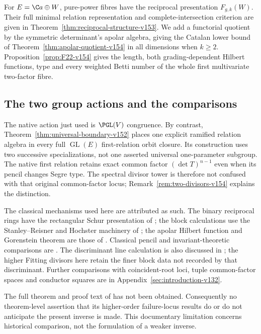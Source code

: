 For $E=\C a\oplus W$, pure-power fibres have the reciprocal
presentation $F_{g,k}(W)$. Their full minimal relation representation
and complete-intersection criterion are given in
Theorem~\ref{thm:reciprocal-structure-v153}. We add a functorial
quotient by the symmetric determinant's apolar algebra, giving the
Catalan lower bound of Theorem~\ref{thm:apolar-quotient-v154} in
all dimensions when $k\geq2$. Proposition~\ref{prop:F22-v154}
gives the length, both grading-dependent Hilbert functions, type
and every weighted Betti number of the whole first multivariate
two-factor fibre.

\subsection{The two group actions and the comparisons}
The native action just used is $\PGL(V)$ congruence. By contrast,
Theorem~\ref{thm:universal-boundary-v152} places one explicit
ramified relation algebra in every full $\operatorname{GL}(E)$
first-relation orbit closure. Its construction uses two successive
specializations, not one asserted universal one-parameter subgroup.
The native first relation retains exact common factor
$(\det T)^{n-1}$ even when its pencil changes Segre type. The
spectral divisor tower is therefore not confused with that original
common-factor locus; Remark~\ref{rem:two-divisors-v154} explains
the distinction.

The classical mechanisms used here are attributed as such. The
binary reciprocal rings have the rectangular Schur presentation
of \cite{Grinberg2019}; the block calculations use the
Stanley--Reisner and Hochster machinery of
\cite{MillerSturmfels2005}; the apolar Hilbert function and
Gorenstein theorem are those of \cite{ShafieiSymmetric}.
Classical pencil and invariant-theoretic comparisons are
\cite{FevolaMandelshtamSturmfels,MFK1994}. The discriminant line
calculation is also discussed in \cite{Krishna2026}; the higher
Fitting divisors here retain the finer block data not recorded by
that discriminant. Further comparisons with coincident-root
loci, tuple common-factor spaces and conductor squares are in
Appendix~\ref{sec:introduction-v132}.

The full theorem and proof text of \cite{Ballico93} has not been
obtained. Consequently no theorem-level assertion that its
higher-order failure-locus results do or do not anticipate the
present inverse is made. This documentary limitation concerns
historical comparison, not the formulation of a weaker inverse.

